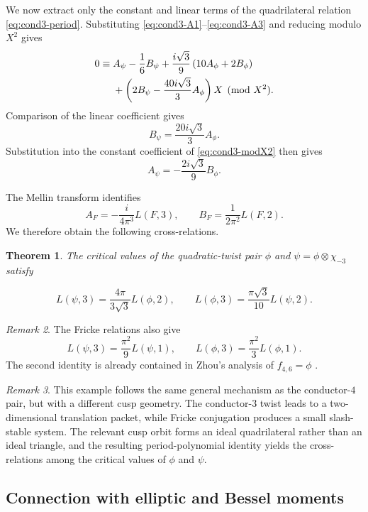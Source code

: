 \documentclass[preprint,12pt]{elsarticle}
\newtheorem{theorem}{Theorem}[section]
\theoremstyle{definition}
\theoremstyle{remark}
\newtheorem{remark}[theorem]{Remark}
\begin{document}
We now extract only the constant and linear terms of the quadrilateral relation \eqref{eq:cond3-period}.  Substituting \eqref{eq:cond3-A1}--\eqref{eq:cond3-A3} and reducing modulo $X^2$ gives
\begin{align}
	0\equiv{}&
	A_\psi-\frac{1}{6}B_\psi
	+\frac{i\sqrt{3}}{9}\left(10A_\phi+2B_\phi\right) \notag\\
	&+
	\left(
	2B_\psi-\frac{40i\sqrt{3}}{3}A_\phi
	\right)X
	\pmod{X^2}.
	\label{eq:cond3-modX2}
\end{align}
Comparison of the linear coefficient gives
\[
B_\psi=\frac{20i\sqrt{3}}{3}A_\phi.
\]
Substitution into the constant coefficient of \eqref{eq:cond3-modX2} then gives
\[
A_\psi=-\frac{2i\sqrt{3}}{9}B_\phi.
\]

The Mellin transform identifies
\[
A_F=-\frac{i}{4\pi^3}L(F,3),
\qquad
B_F=\frac{1}{2\pi^2}L(F,2).
\]
We therefore obtain the following cross-relations.

\begin{theorem}\label{thm:quadratic-twist-critical-values}
	The critical values of the quadratic-twist pair $\phi$ and $\psi=\phi\otimes\chi_{-3}$ satisfy
	
\begin{equation}\label{eq:quadratic-twist-cross-relations}
	L(\psi,3)=\frac{4\pi}{3\sqrt{3}}L(\phi,2),
	\qquad
	L(\phi,3)=\frac{\pi\sqrt{3}}{10}L(\psi,2).
\end{equation}	
\end{theorem}
\begin{remark} The Fricke relations also give $$L(\psi,3)=\frac{\pi^2}{9}L(\psi,1),\qquad L(\phi,3)=\frac{\pi^2}{3}L(\phi,1).$$ The second identity is already contained in Zhou's analysis of $f_{4,6}=\phi$ \cite{MR3798884}.
 \end{remark}

\begin{remark}
	This example follows the same general mechanism as the conductor-$4$ pair, but with a different cusp geometry. The conductor-$3$ twist leads to a two-dimensional translation packet, while Fricke conjugation produces a small slash-stable system. The relevant cusp orbit forms an ideal quadrilateral rather than an ideal triangle, and the resulting period-polynomial identity yields the cross-relations among the critical values of $\phi$ and $\psi$.
\end{remark}




\subsection{Connection with elliptic and Bessel moments}\label{sec:bessel-moments}
\end{document}
